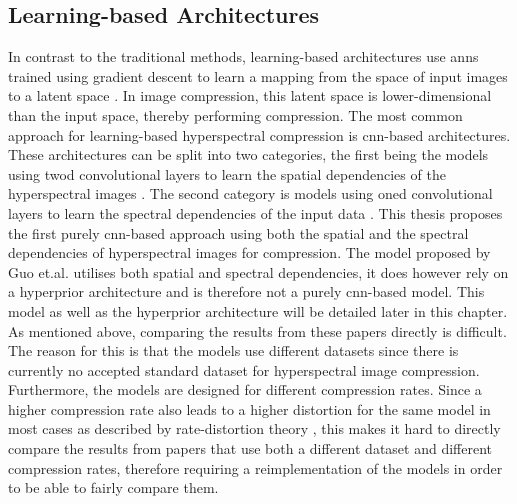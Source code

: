 \subsection{Learning-based Architectures}
In contrast to the traditional methods, learning-based architectures use \acp{ann} trained using gradient descent to learn a mapping from the space of input images to a latent space \citep{ruder_overview_2017}. In image compression, this latent space is lower-dimensional than the input space, thereby performing compression. 
The most common approach for learning-based hyperspectral compression is \ac{cnn}-based architectures. These architectures can be split into two categories, the first being the models using \ac{twod} convolutional layers to learn the spatial dependencies of the hyperspectral images \citep{la_grassa_hyperspectral_2022}. The second category is models using \ac{oned} convolutional layers to learn the spectral dependencies of the input data \citep{kuester_1d-convolutional_2021,kuester_transferability_2022}. This thesis proposes the first purely \ac{cnn}-based approach using both the spatial and the spectral dependencies of hyperspectral images for compression. The model proposed by Guo et.al. \citep{guo_learned_2021} utilises both spatial and spectral dependencies, it does however rely on a hyperprior architecture and is therefore not a purely \ac{cnn}-based model. This model as well as the hyperprior architecture will be detailed later in this chapter.
As mentioned above, comparing the results from these papers directly is difficult. The reason for this is that the models use different datasets since there is currently no accepted standard dataset for hyperspectral image compression. Furthermore, the models are designed for different compression rates. Since a higher compression rate also leads to a higher distortion for the same model in most cases as described by rate-distortion theory \citep{berger_rate-distortion_2003}, this makes it hard to directly compare the results from papers that use both a different dataset and different compression rates, therefore requiring a reimplementation of the models in order to be able to fairly compare them.

